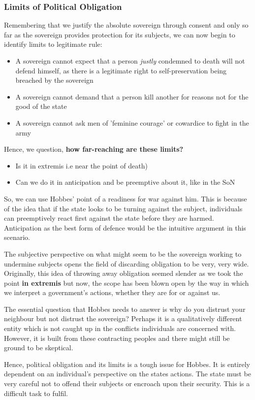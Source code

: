 \documentclass[12pt, letterpaper]{article}
\begin{document}
\subsubsection{Limits of Political Obligation}
Remembering that we justify the absolute sovereign through consent and only so far as the sovereign provides protection for its subjects, we can now begin to identify limits to legitimate rule:
\begin{itemize}
	\item A sovereign cannot expect that a person \textit{justly} condemned to death will not defend himself, as there is a legitimate right to self-preservation being breached by the sovereign
	\item A sovereign cannot demand that a person kill another for reasons not for the good of the state
	\item A sovereign cannot ask men of 'feminine courage' or cowardice to fight in the army
\end{itemize}
Hence, we question, \textbf{how far-reaching are these limits?}
\begin{itemize}
	\item Is it in extremis i.e near the point of death)
	\item Can we do it in anticipation and be preemptive about it, like in the SoN
\end{itemize}
So, we can use Hobbes' point of a readiness for war against him. This is because of the idea that if the state looks to be turning against the subject, individuals can preemptively react first against the state before they are harmed. Anticipation as the best form of defence would be the intuitive argument in this scenario.

The subjective perspective on what might seem to be the sovereign working to undermine subjects opens the field of discarding obligation to be very, very wide. Originally, this idea of throwing away obligation seemed slender as we took the point \textbf{in extremis} but now, the scope has been blown open by the way in which we interpret a government's actions, whether they are for or against us.

The essential question that Hobbes needs to answer is why do you distrust your neighbour but not distrust the sovereign? Perhaps it is a qualitatively different entity which is not caught up in the conflicts individuals are concerned with. However, it is built from these contracting peoples and there might still be ground to be skeptical.

Hence, political obligation and its limits is a tough issue for Hobbes. It is entirely dependent on an individual's perspective on the states actions. The state must be very careful not to offend their subjects or encroach upon their security. This is a difficult task to fulfil.
\end{document}
